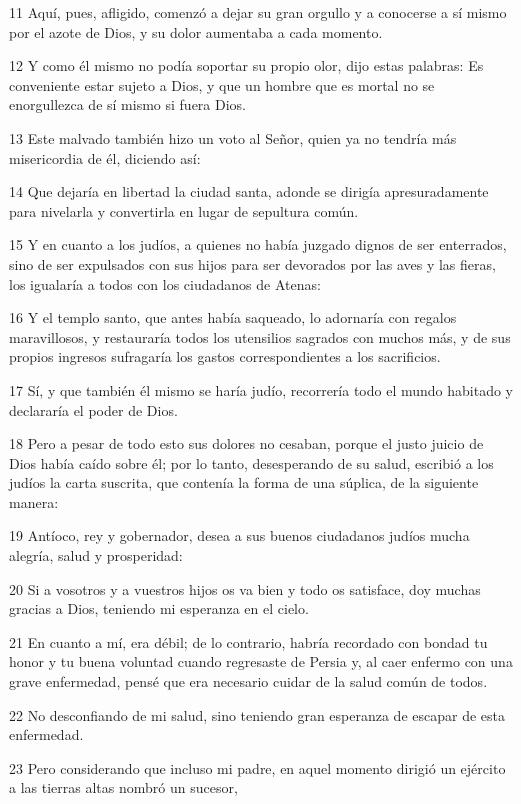 \par 11 Aquí, pues, afligido, comenzó a dejar su gran orgullo y a conocerse a sí mismo por el azote de Dios, y su dolor aumentaba a cada momento.
\par 12 Y como él mismo no podía soportar su propio olor, dijo estas palabras: Es conveniente estar sujeto a Dios, y que un hombre que es mortal no se enorgullezca de sí mismo si fuera Dios.
\par 13 Este malvado también hizo un voto al Señor, quien ya no tendría más misericordia de él, diciendo así:
\par 14 Que dejaría en libertad la ciudad santa, adonde se dirigía apresuradamente para nivelarla y convertirla en lugar de sepultura común.
\par 15 Y en cuanto a los judíos, a quienes no había juzgado dignos de ser enterrados, sino de ser expulsados ​​con sus hijos para ser devorados por las aves y las fieras, los igualaría a todos con los ciudadanos de Atenas:
\par 16 Y el templo santo, que antes había saqueado, lo adornaría con regalos maravillosos, y restauraría todos los utensilios sagrados con muchos más, y de sus propios ingresos sufragaría los gastos correspondientes a los sacrificios.
\par 17 Sí, y que también él mismo se haría judío, recorrería todo el mundo habitado y declararía el poder de Dios.
\par 18 Pero a pesar de todo esto sus dolores no cesaban, porque el justo juicio de Dios había caído sobre él; por lo tanto, desesperando de su salud, escribió a los judíos la carta suscrita, que contenía la forma de una súplica, de la siguiente manera:
\par 19 Antíoco, rey y gobernador, desea a sus buenos ciudadanos judíos mucha alegría, salud y prosperidad:
\par 20 Si a vosotros y a vuestros hijos os va bien y todo os satisface, doy muchas gracias a Dios, teniendo mi esperanza en el cielo.
\par 21 En cuanto a mí, era débil; de lo contrario, habría recordado con bondad tu honor y tu buena voluntad cuando regresaste de Persia y, al caer enfermo con una grave enfermedad, pensé que era necesario cuidar de la salud común de todos.
\par 22 No desconfiando de mi salud, sino teniendo gran esperanza de escapar de esta enfermedad.
\par 23 Pero considerando que incluso mi padre, en aquel momento dirigió un ejército a las tierras altas nombró un sucesor,
